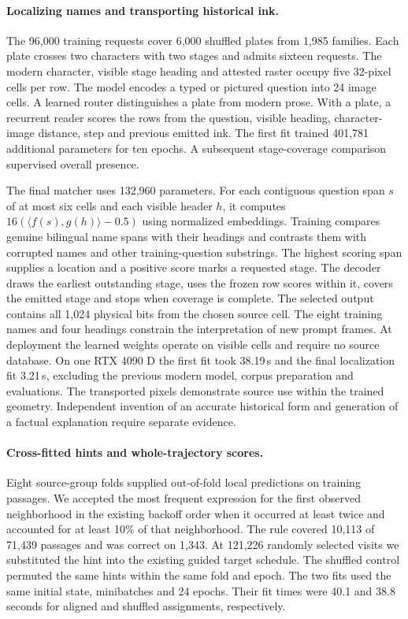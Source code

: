 \documentclass[12pt,a4paper]{article}
\providecommand{\DIFadd}[1]{{\protect\color{blue} \sf #1}} %
\begin{document}
\paragraph{\DIFadd{Localizing names and transporting historical ink.}}
\DIFadd{The 96,000 training requests cover 6,000 shuffled plates from 1,985 families. Each plate crosses two characters with two stages and admits sixteen requests. The modern character, visible stage heading and attested raster occupy five 32-pixel cells per row. The model encodes a typed or pictured question into 24 image cells. A learned router distinguishes a plate from modern prose. With a plate, a recurrent reader scores the rows from the question, visible heading, character-image distance, step and previous emitted ink. The first fit trained 401,781 additional parameters for ten epochs. A subsequent stage-coverage comparison supervised overall presence.
}

\DIFadd{The final matcher uses 132,960 parameters. For each contiguous question span $s$ of at most six cells and each visible header $h$, it computes $16(\langle f(s),g(h)\rangle-0.5)$ using normalized embeddings. Training compares genuine bilingual name spans with their headings and contrasts them with corrupted names and other training-question substrings. The highest scoring span supplies a location and a positive score marks a requested stage. The decoder draws the earliest outstanding stage, uses the frozen row scores within it, covers the emitted stage and stops when coverage is complete. The selected output contains all 1,024 physical bits from the chosen source cell. The eight training names and four headings constrain the interpretation of new prompt frames. At deployment the learned weights operate on visible cells and require no source database. On one RTX 4090 D the first fit took 38.19\,s and the final localization fit 3.21\,s, excluding the previous modern model, corpus preparation and evaluations. The transported pixels demonstrate source use within the trained geometry. Independent invention of an accurate historical form and generation of a factual explanation require separate evidence.
}

\paragraph{\DIFadd{Cross-fitted hints and whole-trajectory scores.}}
\DIFadd{Eight source-group folds supplied out-of-fold local predictions on training passages. We accepted the most frequent expression for the first observed neighborhood in the existing backoff order when it occurred at least twice and accounted for at least 10\% of that neighborhood. The rule covered 10,113 of 71,439 passages and was correct on 1,343. At 121,226 randomly selected visits we substituted the hint into the existing guided target schedule. The shuffled control permuted the same hints within the same fold and epoch. The two fits used the same initial state, minibatches and 24 epochs. Their fit times were 40.1 and 38.8 seconds for aligned and shuffled assignments, respectively.
}
\end{document}
